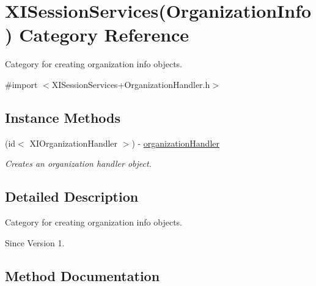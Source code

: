 \hypertarget{category_x_i_session_services_07_organization_info_08}{}\section{X\+I\+Session\+Services(Organization\+Info) Category Reference}
\label{category_x_i_session_services_07_organization_info_08}


Category for creating organization info objects.  




{\ttfamily \#import $<$X\+I\+Session\+Services+\+Organization\+Handler.\+h$>$}

\subsection*{Instance Methods}
\begin{DoxyCompactItemize}
\item 
(id$<$ X\+I\+Organization\+Handler $>$) -\/ \hyperlink{category_x_i_session_services_07_organization_info_08_ab58329523b3d6d4cd586bb9167c90e05}{organization\+Handler}
\begin{DoxyCompactList}\small\item\em Creates an organization handler object. \end{DoxyCompactList}\end{DoxyCompactItemize}


\subsection{Detailed Description}
Category for creating organization info objects. 

\begin{DoxySince}{Since}
Version 1. 
\end{DoxySince}


\subsection{Method Documentation}
\hypertarget{category_x_i_session_services_07_organization_info_08_ab58329523b3d6d4cd586bb9167c90e05}{}\label{category_x_i_session_services_07_organization_info_08_ab58329523b3d6d4cd586bb9167c90e05} 
